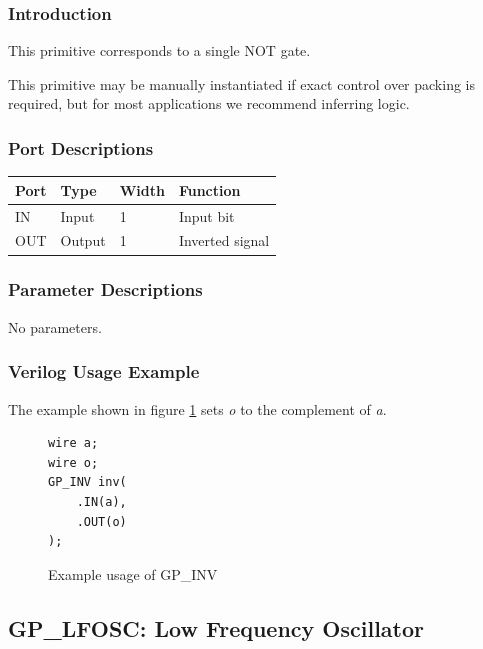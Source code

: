 \documentclass{article}
\begin{document}
\subsubsection{Introduction}
This primitive corresponds to a single NOT gate.

This primitive may be manually instantiated if exact control over packing is required, but for most applications we 
recommend inferring logic.

\subsubsection{Port Descriptions}

\begin{tabularx}{4in}{|l|l|l|X|}
\hline
{\bfseries Port} & {\bfseries Type} & {\bfseries Width} & {\bfseries Function} \\
\hline
IN & Input & 1 & Input bit \\
\hline
OUT & Output & 1 & Inverted signal \\
\hline
\end{tabularx}

\subsubsection{Parameter Descriptions}

No parameters.

\subsubsection{Verilog Usage Example}

The example shown in figure \ref{gp-inv-example} sets \emph{o} to the complement of \emph{a}.

\begin{figure}[h]
\begin{lstlisting}
wire a;
wire o;
GP_INV inv(
	.IN(a),
	.OUT(o)
);
\end{lstlisting}
\caption{Example usage of GP\_INV}
\label{gp-inv-example}
\end{figure}


\pagebreak
\subsection{GP\_LFOSC: Low Frequency Oscillator}
\end{document}
